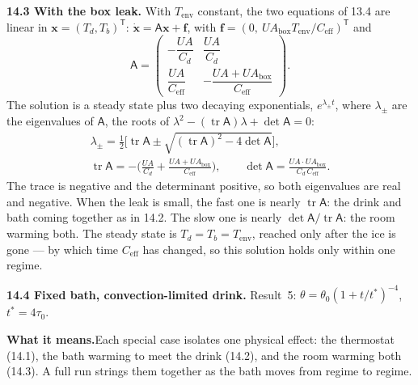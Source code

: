 \documentclass[11pt,a4paper]{article}
\newcommand{\Ceff}{C_{\mathrm{eff}}}
\newcommand{\UAbox}{UA_{\mathrm{box}}}
\newcommand{\Tenv}{T_{\mathrm{env}}}
\newcommand{\sub}[1]{\par\smallskip\noindent\textbf{#1}\enspace}
\newcommand{\means}{\par\noindent\textbf{What it means.}\enspace}
\begin{document}
\sub{14.3 With the box leak.} With $\Tenv$ constant, the two equations of 13.4 are linear in
$\mathbf x = (T_d, T_b)^{\mathsf T}$: $\dot{\mathbf x} = \mathsf A\mathbf x + \mathbf f$, with
$\mathbf f = (0,\ \UAbox\Tenv/\Ceff)^{\mathsf T}$ and
\[
\mathsf A = \begin{pmatrix} -\dfrac{UA}{C_d} & \dfrac{UA}{C_d}\\[8pt] \dfrac{UA}{\Ceff} & -\dfrac{UA+\UAbox}{\Ceff}\end{pmatrix}.
\]
The solution is a steady state plus two decaying exponentials, $e^{\lambda_\pm t}$, where $\lambda_\pm$ are the
eigenvalues of $\mathsf A$, the roots of $\lambda^2 - (\operatorname{tr}\mathsf A)\lambda + \det\mathsf A = 0$:
\begin{gather*}
\lambda_\pm = \tfrac12\Big[\operatorname{tr}\mathsf A \pm \sqrt{(\operatorname{tr}\mathsf A)^2 - 4\det\mathsf A}\Big],
\\
\operatorname{tr}\mathsf A = -\Big(\frac{UA}{C_d} + \frac{UA+\UAbox}{\Ceff}\Big),\qquad
\det\mathsf A = \frac{UA\cdot\UAbox}{C_d\,\Ceff}.
\end{gather*}
The trace is negative and the determinant positive, so both eigenvalues are real and negative. When the
leak is small, the fast one is nearly $\operatorname{tr}\mathsf A$: the drink and bath coming together as
in 14.2. The slow one is nearly $\det\mathsf A/\operatorname{tr}\mathsf A$: the room warming both. The steady state is $T_d = T_b = \Tenv$, reached only after the ice is gone --- by which time
$\Ceff$ has changed, so this solution holds only within one regime.

\sub{14.4 Fixed bath, convection-limited drink.} Result~5: $\theta = \theta_0(1+t/t^*)^{-4}$, $t^* = 4\tau_0$.

\means Each special case isolates one physical effect: the thermostat (14.1), the bath warming to meet the
drink (14.2), and the room warming both (14.3). A full run strings them together as the bath moves from
regime to regime.
\end{document}
